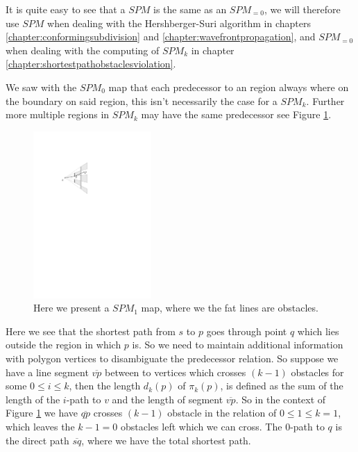 It is quite easy to see that a $SPM$ is the same as an $SPM_{=0}$, we will therefore use $SPM$ when 
dealing with the Hershberger-Suri algorithm in chapters \ref{chapter:conformingsubdivision} and 
\ref{chapter:wavefrontpropagation}, and $SPM_{=0}$ when dealing with the computing of $SPM_k$ in
chapter \ref{chapter:shortestpathobstaclesviolation}.

We saw with the $SPM_0$ map that each predecessor to an region always where on the boundary on said
region, this isn't necessarily the case for a $SPM_k$. Further more multiple regions in $SPM_k$ may 
have the same predecessor see Figure \ref{fig:1predecessor}.

\begin{figure}[H] 
	\centering
	\includegraphics[width=0.4\textwidth]{figures/1predecessor.pdf}
	\caption{Here we present a $SPM_1$ map, where we the fat lines are obstacles.}
	\label{fig:1predecessor} 
\end{figure}

Here we see that the shortest path from $s$ to $p$ goes through point $q$ which lies outside the region
in which $p$ is. So we need to maintain additional information with polygon vertices to disambiguate the 
predecessor relation. So suppose we have a line segment $\overline{vp}$ between to vertices which crosses
$(k-1)$ obstacles for some $0 \leq i \leq k$, then the length $d_k(p)$ of $\pi_k(p)$, is defined as
the sum of the length of the $i$-path to $v$ and the length of segment $\overline{vp}$. So in the context
of Figure \ref{fig:1predecessor}  we have $\overline{qp}$ crosses $(k-1)$ obstacle in the relation of $0 \leq
1 \leq k = 1$, which leaves the $k - 1 = 0$ obstacles left which we can cross. The $0$-path to $q$ is the
direct path $\overline{sq}$, where we have the total shortest path.

